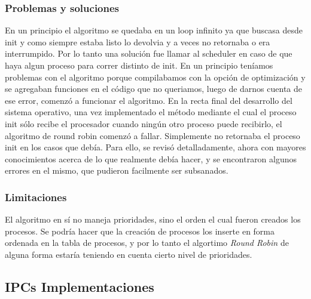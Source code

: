 \documentclass[10pt,a4paper]{article}
\begin{document}
	\subsubsection{Problemas y soluciones}
		En un principio el algoritmo se quedaba en un loop infinito ya que buscasa desde init y como siempre estaba listo lo devolvia y a veces no retornaba o era interrumpido. Por lo tanto una soluci\'on fue llamar al scheduler en caso de que haya algun proceso para correr distinto de init. En un principio ten\'iamos problemas con el algoritmo porque compilabamos con la opci\'on de optimizaci\'on y se agregaban funciones en el c\'odigo que no queriamos, luego de darnos cuenta de ese error, comenz\'o a funcionar el algoritmo.
		En la recta final del desarrollo del sistema operativo, una vez implementado el m\'etodo mediante el cual el proceso init s\'olo recibe el procesador cuando ning\'un otro proceso puede recibirlo, el algoritmo de round robin comenz\'o a fallar. Simplemente no retornaba el proceso init en los casos que deb\'ia. Para ello, se revis\'o detalladamente, ahora con mayores conocimientos acerca de lo que realmente deb\'ia hacer, y se encontraron algunos errores en el mismo, que pudieron facilmente ser subsanados.
	\subsubsection{Limitaciones}
		El algoritmo en s\'i no maneja prioridades, sino el orden el cual fueron creados los procesos. Se podr\'ia hacer que la creaci\'on de procesos los inserte en forma ordenada en la tabla de procesos, y por lo tanto el algortimo \textit{Round Robin} de alguna forma estar\'ia teniendo en cuenta cierto nivel de prioridades.

\subsection{IPCs Implementaciones}
\end{document}
